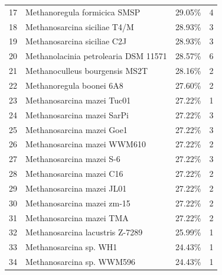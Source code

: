 \documentclass[fontsize=12pt,headsepline=true, bibliography=totocnumbered, twoside]{scrbook} %
\begin{document}
\begin{table}[]
\begin{tabular}{clcc}
17 & Methanoregula formicica SMSP         & 29.05\%                      & 4                         \\
18 & Methanosarcina siciliae T4/M         & 28.93\%                      & 3                         \\
19 & Methanosarcina siciliae C2J          & 28.93\%                      & 3                         \\
20 & Methanolacinia petrolearia DSM 11571 & 28.57\%                      & 6                         \\
21 & Methanoculleus bourgensis MS2T       & 28.16\%                      & 2                         \\
22 & Methanoregula boonei 6A8             & 27.60\%                      & 2                         \\
23 & Methanosarcina mazei Tuc01           & 27.22\%                      & 1                         \\
24 & Methanosarcina mazei SarPi           & 27.22\%                      & 3                         \\
25 & Methanosarcina mazei Goe1            & 27.22\%                      & 3                         \\
26 & Methanosarcina mazei WWM610          & 27.22\%                      & 2                         \\
27 & Methanosarcina mazei S-6             & 27.22\%                      & 3                         \\
28 & Methanosarcina mazei C16             & 27.22\%                      & 2                         \\
29 & Methanosarcina mazei JL01            & 27.22\%                      & 2                         \\
30 & Methanosarcina mazei zm-15           & 27.22\%                      & 2                         \\
31 & Methanosarcina mazei TMA             & 27.22\%                      & 2                         \\
32 & Methanosarcina lacustris Z-7289      & 25.99\%                      & 1                         \\
33 & Methanosarcina sp. WH1               & 24.43\%                      & 1                         \\
34 & Methanosarcina sp. WWM596            & 24.43\%                      & 1                        
\end{tabular}
\label{tb,resultlist}
\end{table}
\end{document}
